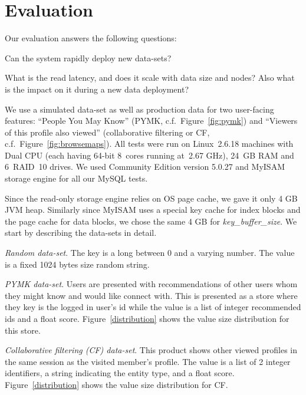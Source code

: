 \section{Evaluation}
\label{sec:evaluation}

Our evaluation answers the following questions:
\begin{compactenum}
\item Can the system rapidly deploy new data-sets? 
\item What is the read latency, and does it scale with data size and nodes? 
Also what is the impact on it during a new data deployment?
\end{compactenum}

\longpage
We use a simulated data-set as well as production data for two
user-facing features: ``People You May Know'' (PYMK,
c.f.~Figure~\ref{fig:pymk}) and ``Viewers of this profile also
viewed'' (collaborative filtering or CF,
c.f.~Figure~\ref{fig:browsemaps}). All tests were run on Linux~2.6.18
machines with Dual CPU (each having 64-bit 8~cores running at~2.67 GHz),
24~GB RAM and 6~RAID~10 drives. We used Community Edition
version 5.0.27 and MyISAM storage engine for all our MySQL tests.

Since the read-only storage engine relies on OS page cache, we gave 
it only 4 GB JVM heap. Similarly since MyISAM uses a special key cache
for index blocks and the page cache for data blocks, we chose the same
4 GB for \emph{key\_buffer\_size}. We start by describing the data-sets in detail.

\longpage
\begin{compactitem}
\item \emph{Random data-set}. The key is a long between
0 and a varying number. The value is a fixed 1024 bytes size random
string. 
\item \emph{PYMK data-set}. Users are presented with recommendations
of other users whom they might know and would like connect with. This
is presented as a store where they key is the logged in user's id
while the value is a list of integer recommended ids and a float
score. Figure~\ref{distribution} shows the value size distribution for
this store. 
\item \emph{Collaborative filtering (CF) data-set}. This product shows
other viewed profiles in the same session as the visited member's
profile. The value is a list of 2 integer identifiers, a string
indicating the entity type, and a float score.
Figure~\ref{distribution} shows the value size distribution for CF. 
\end{compactitem}

